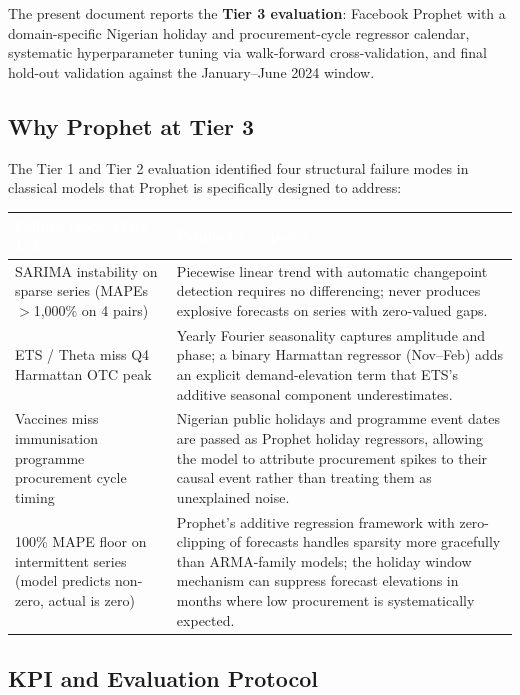 \documentclass[12pt, a4paper]{article}
\begin{document}
The present document reports the \textbf{Tier 3 evaluation}: Facebook
Prophet with a domain-specific Nigerian holiday and procurement-cycle
regressor calendar, systematic hyperparameter tuning via walk-forward
cross-validation, and final hold-out validation against the
January--June 2024 window.

\subsection{Why Prophet at Tier 3}

The Tier 1 and Tier 2 evaluation identified four structural failure
modes in classical models that Prophet is specifically designed to
address:

\vspace{0.5em}
\noindent
\begin{tabularx}{\textwidth}{@{} L{4.2cm} X @{}}
  \toprule
  \textcolor{white}{\textbf{Failure mode (Tier 1/2)}} &
  \textcolor{white}{\textbf{Prophet's response}} \\
  \midrule
  SARIMA instability on sparse series
  (MAPEs $>$1,000\% on 4 pairs) &
    Piecewise linear trend with automatic changepoint detection requires
    no differencing; never produces explosive forecasts on series
    with zero-valued gaps. \\
  ETS / Theta miss Q4 Harmattan OTC peak &
    Yearly Fourier seasonality captures amplitude and phase; a binary
    Harmattan regressor (Nov--Feb) adds an explicit demand-elevation
    term that ETS's additive seasonal component underestimates. \\
  Vaccines miss immunisation programme
  procurement cycle timing &
    Nigerian public holidays and programme event dates are passed as
    Prophet holiday regressors, allowing the model to attribute
    procurement spikes to their causal event rather than treating
    them as unexplained noise. \\
  100\% MAPE floor on intermittent series
  (model predicts non-zero, actual is zero) &
    Prophet's additive regression framework with zero-clipping of
    forecasts handles sparsity more gracefully than ARMA-family models;
    the holiday window mechanism can suppress forecast elevations in
    months where low procurement is systematically expected. \\
  \bottomrule
\end{tabularx}

\subsection{KPI and Evaluation Protocol}
\end{document}
